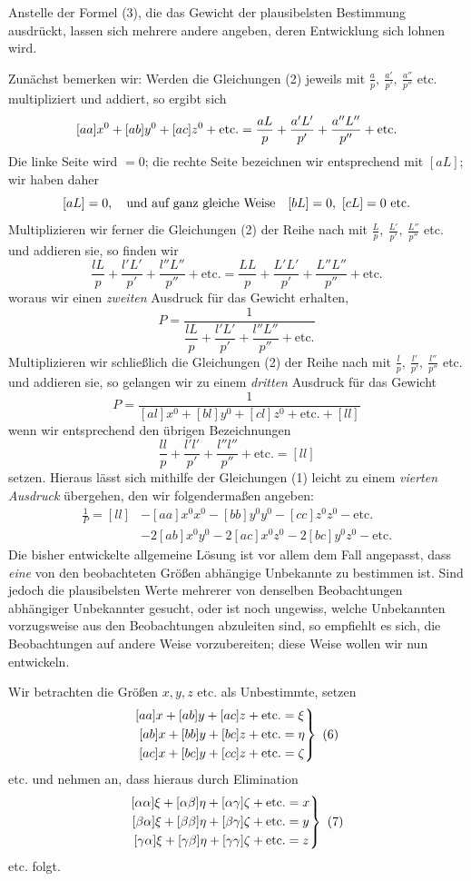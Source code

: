 Anstelle der Formel (3), die das Gewicht der plausibelsten Bestimmung ausdrückt, lassen sich mehrere andere angeben, deren Entwicklung sich lohnen wird.

Zunächst bemerken wir: Werden die Gleichungen (2) jeweils mit \(\frac ap,\ \frac{a'}{p'},\ \frac{a''}{p''}\) etc. multipliziert und addiert, so ergibt sich
\[\relax
[aa]x^0+[ab]y^0+[ac]z^0+\text{etc.}=\frac{aL}{p}+\frac{a'L'}{p'}+\frac{a''L''}{p''}+\text{etc.}
\]
Die linke Seite wird \(=0\); die rechte Seite bezeichnen wir entsprechend mit \([aL]\); wir haben daher
\[\relax
[aL]=0,\quad\text{und auf ganz gleiche Weise}\quad[bL]=0,\ [cL]=0\ \text{etc.}
\]
Multiplizieren wir ferner die Gleichungen (2) der Reihe nach mit \(\frac Lp,\ \frac{L'}{p'},\ \frac{L''}{p''}\) etc. und addieren sie, so finden wir
\[
\frac{lL}{p}+\frac{l'L'}{p'}+\frac{l''L''}{p''}+\text{etc.}=\frac{LL}{p}+\frac{L'L'}{p'}+\frac{L''L''}{p''}+\text{etc.}
\]
woraus wir einen \textit{zweiten} Ausdruck für das Gewicht erhalten,
\[
P=\frac{1}{\dfrac{lL}{p}+\dfrac{l'L'}{p'}+\dfrac{l''L''}{p''}+\text{etc.}}
\]
Multiplizieren wir schließlich die Gleichungen (2) der Reihe nach mit \(\frac lp,\ \frac{l'}{p'},\ \frac{l''}{p''}\) etc. und addieren sie, so gelangen wir zu einem \textit{dritten} Ausdruck für das Gewicht
\[
P=\frac{1}{[al]x^0+[bl]y^0+[cl]z^0+\text{etc.}+[ll]}
\]
wenn wir entsprechend den übrigen Bezeichnungen
\[
\frac{ll}{p}+\frac{l'l'}{p'}+\frac{l''l''}{p''}+\text{etc.}=[ll]
\]
setzen. Hieraus lässt sich mithilfe der Gleichungen (1) leicht zu einem \textit{vierten Ausdruck} übergehen, den wir folgendermaßen angeben:
\[
\begin{aligned}
\frac1P=[ll]&-[aa]x^0x^0-[bb]y^0y^0-[cc]z^0z^0-\text{etc.}\\
&-2[ab]x^0y^0-2[ac]x^0z^0-2[bc]y^0z^0-\text{etc.}
\end{aligned}
\]
Die bisher entwickelte allgemeine Lösung ist vor allem dem Fall angepasst, dass \textit{eine} von den beobachteten Größen abhängige Unbekannte zu bestimmen ist. Sind jedoch die plausibelsten Werte mehrerer von denselben Beobachtungen abhängiger Unbekannter gesucht, oder ist noch ungewiss, welche Unbekannten vorzugsweise aus den Beobachtungen abzuleiten sind, so empfiehlt es sich, die Beobachtungen auf andere Weise vorzubereiten; diese Weise wollen wir nun entwickeln.

Wir betrachten die Größen \(x,y,z\) etc. als Unbestimmte, setzen
\[
\left.\begin{aligned}\relax
[aa]x+[ab]y+[ac]z+\text{etc.}&=\xi\\
[ab]x+[bb]y+[bc]z+\text{etc.}&=\eta\\
[ac]x+[bc]y+[cc]z+\text{etc.}&=\zeta
\end{aligned}\right\}\ (6)
\]
etc. und nehmen an, dass hieraus durch Elimination
\[
\left.\begin{aligned}\relax
[\alpha\alpha]\xi+[\alpha\beta]\eta+[\alpha\gamma]\zeta+\text{etc.}&=x\\
[\beta\alpha]\xi+[\beta\beta]\eta+[\beta\gamma]\zeta+\text{etc.}&=y\\
[\gamma\alpha]\xi+[\gamma\beta]\eta+[\gamma\gamma]\zeta+\text{etc.}&=z
\end{aligned}\right\}\ (7)
\]
etc. folgt.

